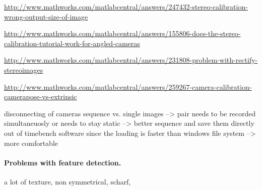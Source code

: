 \url{http://www.mathworks.com/matlabcentral/answers/247432-stereo-calibration-wrong-output-size-of-image}

\url{http://www.mathworks.com/matlabcentral/answers/155806-does-the-stereo-calibration-tutorial-work-for-angled-cameras}

\url{http://www.mathworks.com/matlabcentral/answers/231808-problem-with-rectify-stereoimages}

\url{http://www.mathworks.com/matlabcentral/answers/259267-camera-calibration-camerapose-vs-extrinsic}

disconnecting of cameras
sequence vs. single images --> pair needs to be recorded simultaneuosly or needs to stay static --> better sequence and save them directly out of timebench software since the loading is faster than windows file system --> more comfortable

\paragraph{Problems with feature detection.}
a lot of texture, non symmetrical, scharf,